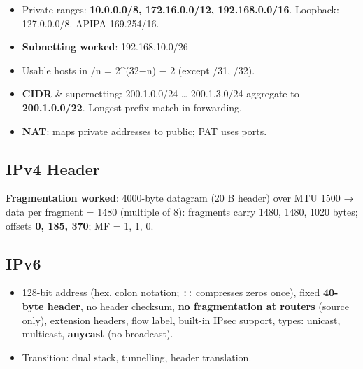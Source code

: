 \endgroup

\begin{itemize}
\tightlist
\item
  Private ranges: \textbf{10.0.0.0/8, 172.16.0.0/12, 192.168.0.0/16}. Loopback: 127.0.0.0/8. APIPA 169.254/16.
\item
  \textbf{Subnetting worked}: 192.168.10.0/26
\end{itemize}



\begin{itemize}
\tightlist
\item
  Usable hosts in /n = 2\^{}(32−n) − 2 (except /31, /32).
\item
  \textbf{CIDR} \& supernetting: 200.1.0.0/24 \ldots{} 200.1.3.0/24 aggregate to \textbf{200.1.0.0/22}. Longest prefix match in forwarding.
\item
  \textbf{NAT}: maps private addresses to public; PAT uses ports.
\end{itemize}

\needspace{95pt}

\hypertarget{p2-09--82-ipv4-header}{%
\subsection{IPv4 Header}\label{p2-09--82-ipv4-header}}



\textbf{Fragmentation worked}: 4000-byte datagram (20 B header) over MTU 1500 → data per fragment = 1480 (multiple of 8):
fragments carry 1480, 1480, 1020 bytes; offsets \textbf{0, 185, 370}; MF = 1, 1, 0.

\needspace{95pt}

\hypertarget{p2-09--83-ipv6}{%
\subsection{IPv6}\label{p2-09--83-ipv6}}

\begin{itemize}
\tightlist
\item
  128-bit address (hex, colon notation; \texttt{::} compresses zeros once), fixed \textbf{40-byte header}, no header checksum, \textbf{no fragmentation at routers} (source only), extension headers, flow label, built-in IPsec support, types: unicast, multicast, \textbf{anycast} (no broadcast).
\item
  Transition: dual stack, tunnelling, header translation.
\end{itemize}

